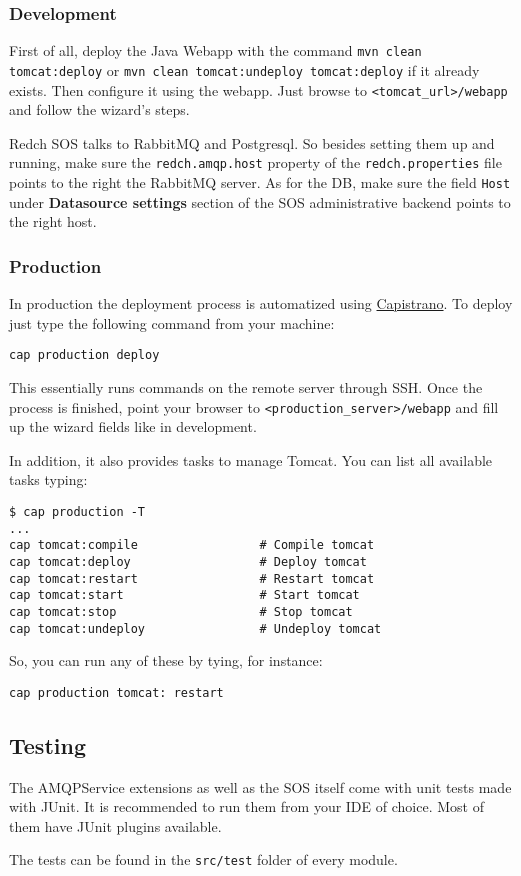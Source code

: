\subsubsection*{Development}\label{development}

First of all, deploy the Java Webapp with the command
\texttt{mvn clean tomcat:deploy} or
\texttt{mvn clean tomcat:undeploy tomcat:deploy} if it already exists.
Then configure it using the webapp. Just browse to
\texttt{\textless{}tomcat\_url\textgreater{}/webapp} and follow the
wizard's steps.

Redch SOS talks to RabbitMQ and Postgresql. So besides setting them up
and running, make sure the \texttt{redch.amqp.host} property of the
\texttt{redch.properties} file points to the right the RabbitMQ server.
As for the DB, make sure the field \texttt{Host} under
\textbf{Datasource settings} section of the SOS administrative backend
points to the right host.

\subsubsection*{Production}\label{production}

In production the deployment process is automatized using
\href{http://capistranorb.com/}{Capistrano}. To deploy just type the
following command from your machine:

\begin{verbatim}
cap production deploy
\end{verbatim}

This essentially runs commands on the remote server through SSH. Once
the process is finished, point your browser to
\texttt{\textless{}production\_server\textgreater{}/webapp} and fill up
the wizard fields like in development.

In addition, it also provides tasks to manage Tomcat. You can list all
available tasks typing:

\begin{verbatim}
$ cap production -T
...
cap tomcat:compile                 # Compile tomcat
cap tomcat:deploy                  # Deploy tomcat
cap tomcat:restart                 # Restart tomcat
cap tomcat:start                   # Start tomcat
cap tomcat:stop                    # Stop tomcat
cap tomcat:undeploy                # Undeploy tomcat
\end{verbatim}

So, you can run any of these by tying, for instance:

\begin{verbatim}
cap production tomcat: restart
\end{verbatim}

\subsection*{Testing}\label{testing}

The AMQPService extensions as well as the SOS itself come with unit
tests made with JUnit. It is recommended to run them from your IDE of
choice. Most of them have JUnit plugins available.

The tests can be found in the \texttt{src/test} folder of every module.

\clearpage
\newpage
